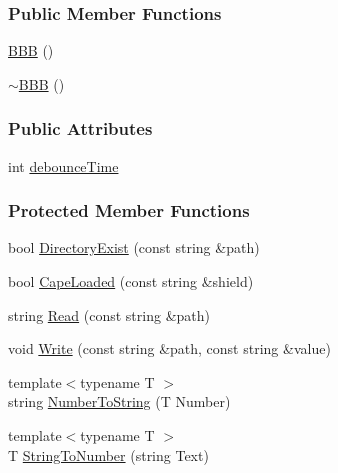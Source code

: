 \subsubsection*{Public Member Functions}
\begin{DoxyCompactItemize}
\item 
\hyperlink{class_hardware_1_1_b_b_b_ab26c0f13cc9488b757e309495ef398d7}{B\+B\+B} ()
\item 
\hyperlink{class_hardware_1_1_b_b_b_a34ee1e17e06e6d229be6d718b9ad1f02}{$\sim$\+B\+B\+B} ()
\end{DoxyCompactItemize}
\subsubsection*{Public Attributes}
\begin{DoxyCompactItemize}
\item 
int \hyperlink{class_hardware_1_1_b_b_b_a353a2d7d4fbade337e5173b484b20b22}{debounce\+Time}
\end{DoxyCompactItemize}
\subsubsection*{Protected Member Functions}
\begin{DoxyCompactItemize}
\item 
bool \hyperlink{class_hardware_1_1_b_b_b_adf431d8e0e8899f7aa16c350a2270e79}{Directory\+Exist} (const string \&path)
\item 
bool \hyperlink{class_hardware_1_1_b_b_b_aaf2f732c771eac0b1ee984dbc0bca784}{Cape\+Loaded} (const string \&shield)
\item 
string \hyperlink{class_hardware_1_1_b_b_b_a8b287ded7bcb2cfab361d1fca2b62e9f}{Read} (const string \&path)
\item 
void \hyperlink{class_hardware_1_1_b_b_b_a155cc06f76d82a6b690ce5ea08e7c68e}{Write} (const string \&path, const string \&value)
\item 
{\footnotesize template$<$typename T $>$ }\\string \hyperlink{class_hardware_1_1_b_b_b_ab2fc876590e3b9b482e3224ba617afba}{Number\+To\+String} (T Number)
\item 
{\footnotesize template$<$typename T $>$ }\\T \hyperlink{class_hardware_1_1_b_b_b_a7484c095027594aa5bfde8b56b73be7b}{String\+To\+Number} (string Text)
\end{DoxyCompactItemize}
